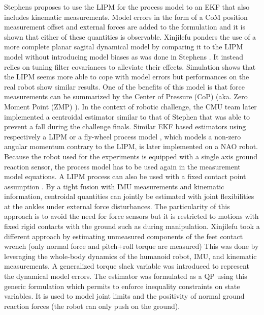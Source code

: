 Stephens \cite{stephens2011state} proposes to use the LIPM for the process model to an EKF 
that also includes kinematic measurements. Model errors in the form of a CoM position measurement 
offset and external forces are added to the formulation and it is shown that either of these quantities is observable. 
Xinjilefu \cite{xinjilefu2012state} ponders the use of a more complete planar sagital dynamical model by comparing it to the LIPM model
without introducing model biases as was done in Stephens \cite{stephens2011state}. It instead relies on tuning filter covariances to alleviate their effects. 
Simulation shows that the LIPM seems more able to cope with model errors but performances on the real robot show similar results. 
One of the benefits of this model is that force measurements can be summarized by the Center of Pressure (CoP) (aka. Zero Moment Point (ZMP) \cite{sardain2004forces}).
In the context of  robotic challenge, the CMU team later implemented a centroidal estimator \cite{xinjilefu2015center} similar to that of Stephen \cite{stephens2011state} 
that was able to prevent a fall during the challenge finals. 
Similar EKF based estimators using respectively a LIPM \cite{piperakis2016non} or a fly-wheel process model \cite{piperakis2018nonlinear}, which models a 
non-zero angular momentum contrary to the LIPM,  is later implemented on a NAO robot. 
Because the robot used for the experiments is equipped with a single axis ground reaction sensor,
the process model has to be used again in the measurement model equations.   
A LIPM process can also be used with a fixed contact point assumption \cite{benallegue2015estimation}. By a tight fusion with IMU 
measurements and kinematic information, centroidal quantities can jointly be estimated with joint flexibilities at the ankles under external force disturbances. 
The particularity of this approach is to avoid the need for force sensors but it is restricted to motions with fixed rigid contacts with the ground 
such as during manipulation.
Xinjilefu \cite{xinjilefu2014dynamic} took a different approach by estimating unmeasured components of the feet contact wrench (only normal force and pitch+roll torque are measured)
This was done by leveraging the whole-body dynamics of the humanoid robot, IMU, and kinematic measurements. 
A generalized torque slack variable was introduced to represent the dynamical model errors. %
The estimator was formulated as a QP using this generic formulation which permits to enforce inequality constraints on state variables. 
It is used to model joint limits and the positivity of normal ground reaction forces (the robot can only push on the ground).


